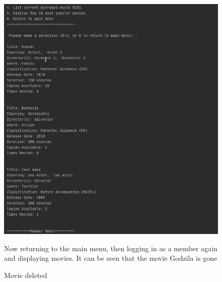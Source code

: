 \documentclass[a4paper,12pt]{article}
\begin{document}
\begin{figure}[!htb]
\centering
\includegraphics[width=1\textwidth]{13}
\caption{Movie deleted}
\medskip
\small
Now returning to the main menu, then logging in as a member again and displaying movies. It can be seen that the movie Godzila is gone
\end{figure}
\end{document}
